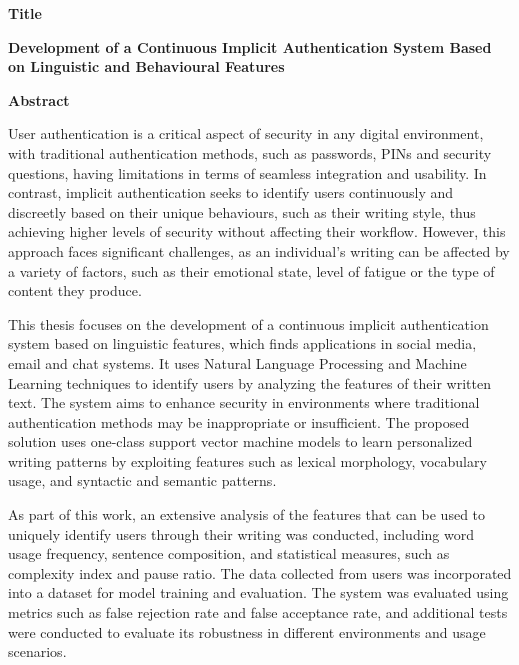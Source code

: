 {\selectfont

{}

\begin{center}
  \centering
  \textbf{\Large{Title}}
  \vspace{0.5cm}

  \textbf{\large{Development of a Continuous Implicit Authentication System Based on Linguistic and Behavioural Features}}

  \vspace{1cm}

  \centering
  \textbf{Abstract}
\end{center}
\begin{sloppypar}

    User authentication is a critical aspect of security in any digital environment, with traditional authentication methods, such as passwords, PINs and security questions, having limitations in terms of seamless integration and usability. In contrast, implicit authentication seeks to identify users continuously and discreetly based on their unique behaviours, such as their writing style, thus achieving higher levels of security without affecting their workflow. However, this approach faces significant challenges, as an individual's writing can be affected by a variety of factors, such as their emotional state, level of fatigue or the type of content they produce.

    This thesis focuses on the development of a continuous implicit authentication system based on linguistic features, which finds applications in social media, email and chat systems. It uses Natural Language Processing and Machine Learning techniques to identify users by analyzing the features of their written text. The system aims to enhance security in environments where traditional authentication methods may be inappropriate or insufficient. The proposed solution uses one-class support vector machine models to learn personalized writing patterns by exploiting features such as lexical morphology, vocabulary usage, and syntactic and semantic patterns.

    As part of this work, an extensive analysis of the features that can be used to uniquely identify users through their writing was conducted, including word usage frequency, sentence composition, and statistical measures, such as complexity index and pause ratio. The data collected from users was incorporated into a dataset for model training and evaluation. The system was evaluated using metrics such as false rejection rate and false acceptance rate, and additional tests were conducted to evaluate its robustness in different environments and usage scenarios.


\end{sloppypar}}
